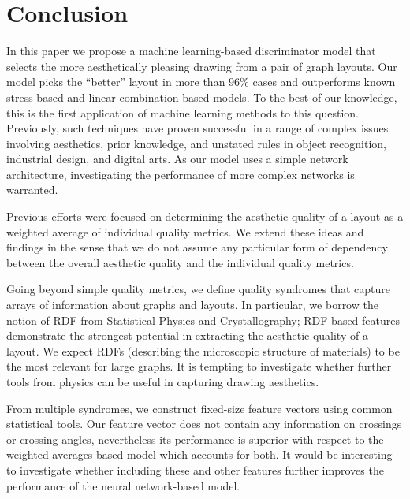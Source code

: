 
%

\section{Conclusion}
\label{sec:conclusion}

In this paper we propose a machine learning-based discriminator model that selects the more aesthetically pleasing
drawing from a pair of graph layouts.  Our model picks the \enquote{better} layout in more than $96\percent$ cases and
outperforms known stress-based and linear combination-based models.  To the best of our knowledge, this is the first
application of machine learning methods to this question.  Previously, such techniques have proven successful in a range
of complex issues involving aesthetics, prior knowledge, and unstated rules in object recognition, industrial design,
and digital arts.  As our model uses a simple network architecture, investigating the performance of more complex
networks is warranted.

Previous efforts were focused on determining the aesthetic quality of a layout as a weighted average of individual
quality metrics.  We extend these ideas and findings in the sense that we do not assume any particular form of
dependency between the overall aesthetic quality and the individual quality metrics.

Going beyond simple quality metrics, we define quality syndromes that capture arrays of information about graphs and
layouts.  In particular, we borrow the notion of RDF from Statistical Physics and Crystallography; RDF-based features
demonstrate the strongest potential in extracting the aesthetic quality of a layout.  We expect RDFs (describing the
microscopic structure of materials) to be the most relevant for large graphs.  It is tempting to investigate whether
further tools from physics can be useful in capturing drawing aesthetics.

From multiple syndromes, we construct fixed-size feature vectors using common statistical tools.  Our feature vector
does not contain any information on crossings or crossing angles, nevertheless its performance is superior with respect
to the weighted averages-based model which accounts for both.  It would be interesting to investigate whether including
these and other features further improves the performance of the neural network-based model.


